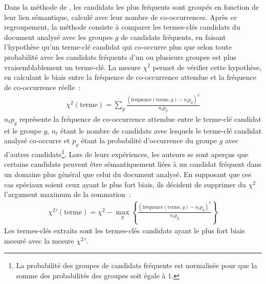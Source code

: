           Dans la méthode de \citet{matsuo2004wordcooccurrence}, les candidats
          les plus fréquents sont groupés en fonction de leur lien sémantique,
          calculé avec leur nombre de co-occurrences. Après ce regroupement, la
          méthode consiste à comparer les termes-clés candidats du document
          analysé avec les groupes $g$ de candidats fréquents, en faisant
          l'hypothèse qu'un terme-clé candidat qui co-occurre plus que selon
          toute probabilité avec les candidats fréquents d'un ou plusieurs
          groupes est plus vraisemblablement un terme-clé. La mesure $\chi^2$
          permet de vérifier cette hypothèse, en calculant le biais entre la
          fréquence de co-occurrence attendue et la fréquence de co-occurrence
          réelle~:
          \begin{align}
            \chi^2(\text{terme}) = \sum_{g} \frac{(\text{fréquence}(\text{terme}, g) - n_tp_g)^2}{n_tp_g}
          \end{align}
          $n_tp_g$ représente la fréquence de co-occurrence attendue entre le
          terme-clé candidat et le groupe $g$, $n_t$ étant le nombre de
          candidats avec lesquels le terme-clé candidat analysé co-occurre et
          $p_g$ étant la probabilité d'occurrence du groupe $g$ avec d'autres
          candidats\footnote{La probabilité des groupes de candidats fréquents
          est normalisée pour que la somme des probabilités des groupes soit
          égale à $1$.}. Lors de leurs expériences, les auteurs se sont aperçus
          que certains candidats peuvent être sémantiquement liées à un
          candidat fréquent dans un domaine plus général que celui du document
          analysé. En supposant que ces cas spéciaux soient ceux ayant le plus
          fort biais, ils décident de supprimer du $\chi^2$ l'argument maximum
          de la sommation~:
          \begin{align}
            \chi^2{'}(\text{terme}) = \chi^2 - \max_{g}\left\{\frac{(\text{fréquence}(\text{terme}, g) - n_tp_g)^2}{n_tp_g}\right\}
          \end{align}
          Les termes-clés extraits sont les termes-clés candidats ayant le plus
          fort biais mesuré avec la mesure $\chi^2{'}$.

